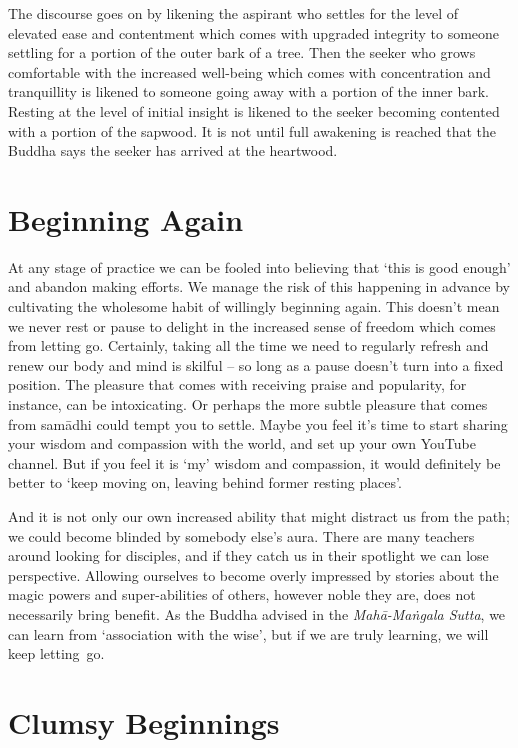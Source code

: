The discourse goes on by likening the aspirant who settles for the level
of elevated ease and contentment which comes with upgraded integrity to
someone settling for a portion of the outer bark of a tree. Then the
seeker who grows comfortable with the increased well-being which comes
with concentration and tranquillity is likened to someone going away
with a portion of the inner bark. Resting at the level of initial
insight is likened to the seeker becoming contented with a portion of
the sapwood. It is not until full awakening is reached that the Buddha
says the seeker has arrived at the heartwood.

\section{Beginning Again}

At any stage of practice we can be fooled into believing that ‘this is
good enough’ and abandon making efforts. We manage the risk of this
happening in advance by cultivating the wholesome habit of willingly
beginning again. This doesn’t mean we never rest or pause to delight in
the increased sense of freedom which comes from letting go. Certainly,
taking all the time we need to regularly refresh and renew our body and
mind is skilful – so long as a pause doesn’t turn into a fixed position.
The pleasure that comes with receiving praise and popularity, for
instance, can be intoxicating. Or perhaps the more subtle pleasure that
comes from samādhi could tempt you to settle. Maybe you feel it’s time
to start sharing your wisdom and compassion with the world, and set up
your own YouTube channel. But if you feel it is ‘my’ wisdom and
compassion, it would definitely be better to ‘keep moving on, leaving
behind former resting places’.

\enlargethispage*{\baselineskip}

And it is not only our own increased ability that might distract us from
the path; we could become blinded by somebody else’s aura. There are
many teachers around looking for disciples, and if they catch us in
their spotlight we can lose perspective. Allowing ourselves to become
overly impressed by stories about the magic powers and super-abilities
of others, however noble they are, does not necessarily bring benefit. As
the Buddha advised in
the \emph{Mahā-Maṅgala Sutta},\cite{mahamangala-sutta}
we can learn from ‘association with the wise’, but if we are truly learning, we will keep
letting~go.

\section{Clumsy Beginnings}

